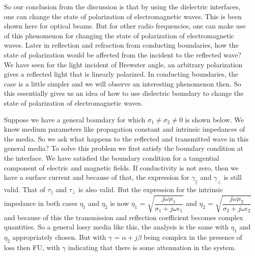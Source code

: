 So our conclusion from the discussion is that by using the dielectric interfaces, one can change the state of polarization of electromagnetic waves. This is been shown here for optical beams. But for other radio frequencies, one can make use of this phenomenon for changing the state of polarization of electromagnetic waves.
Later in reflection and refraction from conducting boundaries, how the state of polarization would be affected from the incident to the reflected wave?  We have seen for the light incident of Brewster angle, an arbitrary polarization gives a reflected light that is linearly polarized. In conducting boundaries, the case is a little simpler and we will observe an interesting phenomenon then. So this essentially gives us an idea of how to use dielectric boundary to change the state of polarization of electromagnetic waves. 

Suppose we have a general boundary for which $\sigma_1 \neq \sigma_2 \neq 0$ is shown below. We know medium parameters like propagation constant and intrinsic impedances of the media. So we ask what happens to the reflected and transmitted wave in this general media? To solve this problem we first satisfy the boundary condition at the interface. We have satisfied the boundary condition for a tangential component of electric and magnetic fields. If conductivity is not zero, then we have a surface current and because of that, the expression for $\gamma_\parallel$ and $\gamma_\perp$ is still valid. That of $\tau_\parallel$ and $\tau_\perp$ is also valid. But the expression for the intrinsic impedance in both cases $\eta_1$ and $\eta_2$ is now $\eta_1$ = $\sqrt{\dfrac{j\omega\mu_1}{\sigma_1 + j\omega\epsilon_1}}$ and $\eta_2$ = $\sqrt{\dfrac{j\omega\mu_2}{\sigma_2 + j\omega\epsilon_2}}$  and because of this the transmission and reflection coefficient becomes complex quantities.
So a general lossy media like this, the analysis is the same with $\eta_1$ and $\eta_2$ appropriately chosen. But with $\gamma$ = $\alpha + j\beta$ being complex in the presence of loss then FU, with $\gamma$ indicating that there is some attenuation in the system. 


